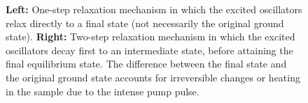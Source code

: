 \begin{figure}[t!]
	\caption{\textbf{Left:} One-step relaxation mechanism in which the excited oscillators relax directly to a final state (not necessarily the original ground state). \textbf{Right:} Two-step relaxation mechanism in which the excited oscillators decay first to an intermediate state, before attaining the final equilibrium state. The difference between the final state and the original ground state accounts for irreversible changes or heating in the sample due to the intense pump pulse.}
	\label{simplestschem}			
\end{figure}



